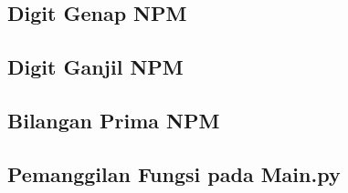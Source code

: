 \subsection{Digit Genap NPM}

\subsection{Digit Ganjil NPM}

\subsection{Bilangan Prima NPM}

\subsection{Pemanggilan Fungsi pada Main.py}
